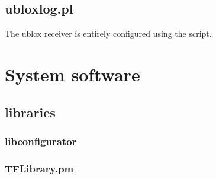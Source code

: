 \documentclass[11pt,a4paper,openany,oneside]{book}
\begin{document}
\section{ubloxlog.pl}
\hypertarget{h:ubloxlog}{}

The ublox receiver is entirely configured using the script.



\chapter{System software}











\section{libraries}

\subsection{libconfigurator}

\subsection{TFLibrary.pm}




\end{document}
